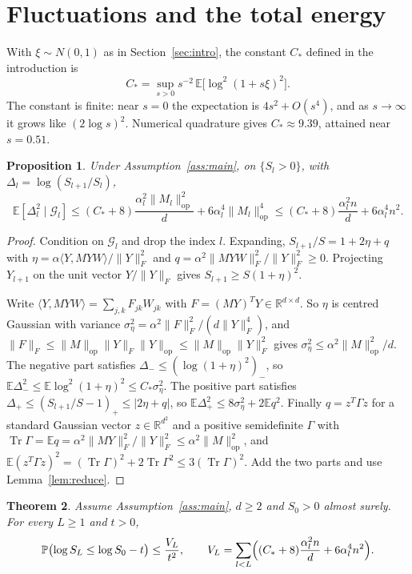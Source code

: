 \documentclass[11pt]{amsart}
\newtheorem{theorem}{Theorem}[section]
\newtheorem{proposition}[theorem]{Proposition}
\theoremstyle{definition}
\theoremstyle{remark}
\numberwithin{equation}{section}
\newcommand{\EE}{\mathbb{E}}
\newcommand{\PP}{\mathbb{P}}
\newcommand{\RR}{\mathbb{R}}
\newcommand{\cG}{\mathcal{G}}
\newcommand{\op}{\mathrm{op}}
\DeclareMathOperator{\Tr}{Tr}
\begin{document}
\section{Fluctuations and the total energy}\label{sec:bounds}

With $\xi\sim N(0,1)$ as in Section~\ref{sec:intro}, the constant $C_*$ defined in the introduction is
\begin{equation}
C_*=\sup_{s>0}s^{-2}\,\EE\bigl[\log^2(1+s\xi)^2\bigr].\label{eq:C2}
\end{equation}
The constant is finite: near $s=0$ the expectation is $4s^2+O(s^4)$, and as $s\to\infty$ it grows like $(2\log s)^2$. Numerical quadrature gives $C_*\approx9.39$, attained near $s=0.51$.

\begin{proposition}\label{prop:second}
Under Assumption~\ref{ass:main}, on $\{S_l>0\}$, with $\Delta_l=\log(S_{l+1}/S_l)$,
\[
\EE[\Delta_l^2\mid\cG_l]\le(C_*+8)\frac{\alpha_l^2\|M_l\|_\op^2}d+6\alpha_l^4\|M_l\|_\op^4\le(C_*+8)\frac{\alpha_l^2n}d+6\alpha_l^4n^2.
\]
\end{proposition}

\begin{proof}
Condition on $\cG_l$ and drop the index $l$. Expanding, $S_{l+1}/S=1+2\eta+q$ with $\eta=\alpha\langle Y,MYW\rangle/\|Y\|_F^2$ and $q=\alpha^2\|MYW\|_F^2/\|Y\|_F^2\ge0$. Projecting $Y_{l+1}$ on the unit vector $Y/\|Y\|_F$ gives $S_{l+1}\ge S(1+\eta)^2$.

Write $\langle Y,MYW\rangle=\sum_{j,k}F_{jk}W_{jk}$ with $F=(MY)^{T}Y\in\RR^{d\times d}$. So $\eta$ is centred Gaussian with variance $\sigma_\eta^2=\alpha^2\|F\|_F^2/(d\|Y\|_F^4)$, and $\|F\|_F\le\|M\|_\op\|Y\|_F\|Y\|_\op\le\|M\|_\op\|Y\|_F^2$ gives $\sigma_\eta^2\le\alpha^2\|M\|_\op^2/d$. The negative part satisfies $\Delta_-\le(\log(1+\eta)^2)_-$, so $\EE\Delta_-^2\le\EE\log^2(1+\eta)^2\le C_*\sigma_\eta^2$. The positive part satisfies $\Delta_+\le(S_{l+1}/S-1)_+\le|2\eta+q|$, so $\EE\Delta_+^2\le8\sigma_\eta^2+2\EE q^2$. Finally $q=z^{T}\Gamma z$ for a standard Gaussian vector $z\in\RR^{d^2}$ and a positive semidefinite $\Gamma$ with $\Tr\Gamma=\EE q=\alpha^2\|MY\|_F^2/\|Y\|_F^2\le\alpha^2\|M\|_\op^2$, and $\EE(z^{T}\Gamma z)^2=(\Tr\Gamma)^2+2\Tr\Gamma^2\le3(\Tr\Gamma)^2$. Add the two parts and use Lemma~\ref{lem:reduce}.
\end{proof}

\begin{theorem}\label{thm:tail}
Assume Assumption~\ref{ass:main}, $d\ge2$ and $S_0>0$ almost surely. For every $L\ge1$ and $t>0$,
\[
\PP\bigl(\log S_L\le\log S_0-t\bigr)\le\frac{V_L}{t^2},\qquad V_L=\sum_{l<L}\Bigl((C_*+8)\frac{\alpha_l^2n}d+6\alpha_l^4n^2\Bigr).
\]
\end{theorem}
\end{document}
